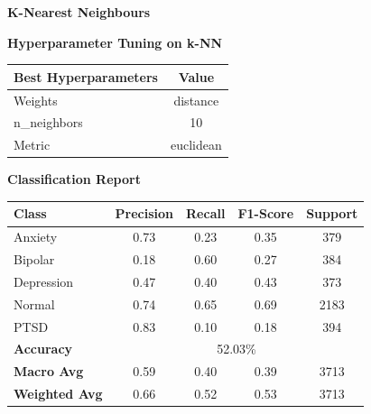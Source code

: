 \pagebreak
\vspace{1.5em}
\noindent
\textbf{K-Nearest Neighbours}
\begin{center}
    \textbf{Hyperparameter Tuning on k-NN} \\[0.5em]
    \begin{tabular}{|l|c|}
        \hline
        \textbf{Best Hyperparameters}  & \textbf{Value} \\ \hline
        Weights                       & distance       \\ \hline
        n\_neighbors                  & 10             \\ \hline
        Metric                        & euclidean      \\ \hline
    \end{tabular}
\end{center}

\begin{center}
    \textbf{Classification Report} \\[0.5em]
    \begin{tabular}{|l|c|c|c|c|}
        \hline
        \textbf{Class} & \textbf{Precision} & \textbf{Recall} & \textbf{F1-Score} & \textbf{Support} \\ \hline
        Anxiety        & 0.73               & 0.23            & 0.35              & 379             \\ \hline
        Bipolar        & 0.18               & 0.60            & 0.27              & 384             \\ \hline
        Depression     & 0.47               & 0.40            & 0.43              & 373             \\ \hline
        Normal         & 0.74               & 0.65            & 0.69              & 2183            \\ \hline
        PTSD           & 0.83               & 0.10            & 0.18              & 394             \\ \hline
        \textbf{Accuracy} & \multicolumn{4}{|c|}{52.03\%} \\ \hline
        \textbf{Macro Avg} & 0.59            & 0.40            & 0.39              & 3713            \\ \hline
        \textbf{Weighted Avg} & 0.66         & 0.52            & 0.53              & 3713            \\ \hline
    \end{tabular}
\end{center}

